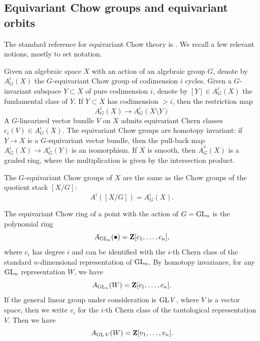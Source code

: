 \documentclass[12pt,reqno]{amsart}
\renewcommand{\to}{{\longrightarrow}}
\numberwithin{equation}{section}
\begin{document}
\subsection{Equivariant Chow groups and equivariant orbits}
The standard reference for equivariant Chow theory is \cite{edi.gra:98}.
We recall a few relevant notions, mostly to set notation.

Given an algebraic space $X$ with an action of an algebraic group $G$,
denote by $A^i_G(X)$ the $G$-equivariant Chow group of codimension $i$
cycles.  Given a $G$-invariant subspace $Y \subset X$ of pure
codimension $i$, denote by $[Y] \in A^i_G(X)$ the fundamental class of
$Y$.  If $Y \subset X$ has codimension $> i$, then the restriction map
\[ A^i_G(X) \to A^i_G(X \setminus Y)\] A $G$-linearized vector bundle
$V$ on $X$ admits equivariant Chern classes $c_i(V) \in A^i_G(X)$.
The equivariant Chow groups are homotopy invariant: if $Y \to X$ is a
$G$-equivariant vector bundle, then the pull-back map
$A^i_G(X) \to A^i_G(Y)$ is an isomorphism.  If $X$ is smooth, then
$A^*_G(X)$ is a graded ring, where the multiplication is given by the
intersection product.

The $G$-equivariant Chow groups of $X$ are the same as the Chow groups
of the quotient stack $[X/G]$:
\[ A^i\left( [X/G] \right) = A^i_G(X).\]

The equivariant Chow ring of a point with the action of $G = \operatorname{GL}_n$ is
the polynomial ring
\[ A_{\operatorname{GL}_n}(\bullet) = {\bf Z}[c_1,\dots, c_n],\] where $c_i$ has
degree $i$ and can be identified with the $i$-th Chern class of the
standard $n$-dimensional representation of $\operatorname{GL}_n$.  By homotopy
invariance, for any $\operatorname{GL}_n$ representation $W$, we have
\[ A_{\operatorname{GL}_n}(W) = {\bf Z}[c_1,\dots,c_n].\] If the general linear
group under consideration is $\operatorname{GL} V$, where $V$ is a vector space,
then we write $v_i$ for the $i$-th Chern class of the tautological
representation $V$.  Then we have
\[ A_{\operatorname{GL} V}(W) = {\bf Z}[v_1,\dots,v_n].\]
\end{document}
